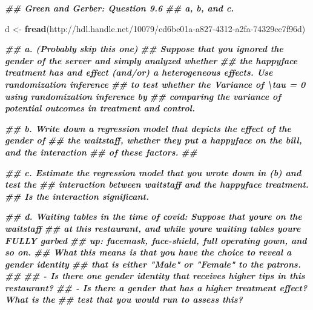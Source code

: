\documentclass[
]{article}
\newenvironment{Shaded}{\begin{snugshade}}{\end{snugshade}}
\newcommand{\DocumentationTok}[1]{\textcolor[rgb]{0.56,0.35,0.01}{\textbf{\textit{#1}}}}
\newcommand{\FunctionTok}[1]{\textcolor[rgb]{0.13,0.29,0.53}{\textbf{#1}}}
\newcommand{\NormalTok}[1]{#1}
\newcommand{\OtherTok}[1]{\textcolor[rgb]{0.56,0.35,0.01}{#1}}
\newcommand{\StringTok}[1]{\textcolor[rgb]{0.31,0.60,0.02}{#1}}
\theoremstyle{definition}
\theoremstyle{definition}
\theoremstyle{definition}
\theoremstyle{definition}
\theoremstyle{remark}
\begin{document}
\begin{Shaded}
\begin{Highlighting}[]
\DocumentationTok{\#\# Green and Gerber: Question 9.6}
\DocumentationTok{\#\# a, b, and c. }

\NormalTok{d }\OtherTok{\textless{}{-}} \FunctionTok{fread}\NormalTok{(}\StringTok{\textquotesingle{}http://hdl.handle.net/10079/cd6be01a{-}a827{-}4312{-}a2fa{-}74329ce7f96d\textquotesingle{}}\NormalTok{)}

\DocumentationTok{\#\# a. (Probably skip this one)}
\DocumentationTok{\#\#    Suppose that you ignored the gender of the server and simply analyzed whether}
\DocumentationTok{\#\#    the happyface treatment has and effect (and/or) a heterogeneous effects. Use randomization inference }
\DocumentationTok{\#\#    to test whether the Variance of \textbackslash{}tau = 0 using randomization inference by }
\DocumentationTok{\#\#    comparing the variance of potential outcomes in treatment and control. }

\DocumentationTok{\#\# b. Write down a regression model that depicts the effect of the gender of }
\DocumentationTok{\#\#    the waitstaff, whether they put a happyface on the bill, and the interaction }
\DocumentationTok{\#\#    of these factors. }
\DocumentationTok{\#\# }

\DocumentationTok{\#\# c. Estimate the regression model that you wrote down in (b) and test the }
\DocumentationTok{\#\#    interaction between waitstaff and the happyface treatment. }
\DocumentationTok{\#\#    Is the interaction significant. }

\DocumentationTok{\#\# d. Waiting tables in the time of covid: Suppose that you\textquotesingle{}re on the waitstaff }
\DocumentationTok{\#\#    at this restaurant, and while you\textquotesingle{}re waiting tables you\textquotesingle{}re FULLY garbed }
\DocumentationTok{\#\#    up: facemask, face{-}shield, full operating gown, and so on. }
\DocumentationTok{\#\#    What this means is that you have the choice to reveal a gender identity}
\DocumentationTok{\#\#    that is either "Male" or "Female" to the patrons. }
\DocumentationTok{\#\# }
\DocumentationTok{\#\#    {-} Is there one gender identity that receives higher tips in this restaurant? }
\DocumentationTok{\#\#    {-} Is there a gender that has a higher treatment effect? What is the }
\DocumentationTok{\#\#      test that you would run to assess this? }
\end{Highlighting}
\end{Shaded}
\end{document}

